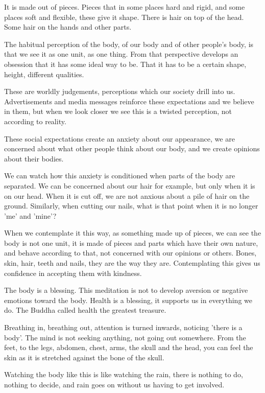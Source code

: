 It is made out of pieces. Pieces that in some places hard and rigid, and
some places soft and flexible, these give it shape. There is hair on top
of the head. Some hair on the hands and other parts.

The habitual perception of the body, of our body and of other people's
body, is that we see it as one unit, as one thing. From that perspective
develops an obsession that it has some ideal way to be. That it has to
be a certain shape, height, different qualities.

These are worldly judgements, perceptions which our society drill into
us. Advertisements and media messages reinforce these expectations and
we believe in them, but when we look closer we see this is a twisted
perception, not according to reality.

These social expectations create an anxiety about our appearance, we are
concerned about what other people think about our body, and we create
opinions about their bodies.

We can watch how this anxiety is conditioned when parts of the body are
separated. We can be concerned about our hair for example, but only when
it is on our head. When it is cut off, we are not anxious about a pile
of hair on the ground. Similarly, when cutting our nails, what is that
point when it is no longer 'me' and 'mine'?

When we contemplate it this way, as something made up of pieces, we can
see the body is not one unit, it is made of pieces and parts which have
their own nature, and behave according to that, not concerned with our
opinions or others. Bones, skin, hair, teeth and nails, they are the way
they are. Contemplating this gives us confidence in accepting them with
kindness.

The body is a blessing. This meditation is not to develop aversion or
negative emotions toward the body. Health is a blessing, it supports us
in everything we do. The Buddha called health the greatest treasure.

Breathing in, breathing out, attention is turned inwards, noticing
'there is a body'. The mind is not seeking anything, not going out
somewhere. From the feet, to the legs, abdomen, chest, arms, the skull
and the head, you can feel the skin as it is stretched against the bone
of the skull.

Watching the body like this is like watching the rain, there is nothing
to do, nothing to decide, and rain goes on without us having to get
involved.


